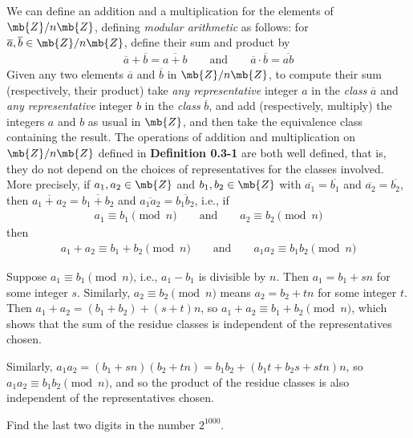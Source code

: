 {We can define an addition and a multiplication for the elements of $\mb{Z}/n\mb{Z}$,
defining {\sl modular arithmetic} as follows: for $\overline{a},\overline{b}\in\mb{Z}/n\mb{Z}$,
define their sum and product by
\begin{align*}
    \overline{a} + \overline{b} = \overline{a+b}\qquad\text{and}\qquad
    \overline{a} \cdot \overline{b} = \overline{ab}
\end{align*}}
Given any two elements $\overline{a}$ and $\overline{b}$ in $\mb{Z}/n\mb{Z}$, to compute
their sum (respectively, their product) take {\sl any representative} integer $a$ in the
{\sl class} $\overline{a}$ and {\sl any representative} integer $b$ in the {\sl class} $\overline{b}$,
and add (respectively, multiply) the integers $a$ and $b$ as usual in $\mb{Z}$, and then take
the equivalence class containing the result.
{The operations of addition and multiplication on $\mb{Z}/n\mb{Z}$ defined in \textbf{\textsf{\color{green!60!blue} Definition 0.3-1}}
are both well defined, that is, they do not depend on the choices of representatives for the classes involved.
More precisely, if $a_{1}, a_{2}\in \mb{Z}$ and $b_{1}, b_{2}\in \mb{Z}$ with $\overline{a_{1}} = \overline{b_{1}}$
and $\overline{a_{2}} = \overline{b_{2}}$, then $\overline{a_{1}+a_{2}} = \overline{b_{1} + b_{2}}$ and $\overline{a_{1}a_{2}} = \overline{b_{1}b_{2}}$, i.e., if
\begin{align*}
    a_{1} \equiv b_{1}\pmod{n}
    \qquad\text{and}\qquad
    a_{2} \equiv b_{2}\pmod{n}
\end{align*}
then
\begin{align*}
    a_{1} + a_{2} \equiv b_{1} + b_{2}\pmod{n}
    \qquad\text{and}\qquad
    a_{1}a_{2} \equiv b_{1}b_{2}\pmod{n}
\end{align*}
}
{Suppose $a_{1}\equiv b_{1}\pmod{n}$, i.e., $a_{1}-b_{1}$ is divisible by $n$.
Then $a_{1} = b_{1} + sn$ for some integer $s$.
Similarly, $a_{2}\equiv b_{2}\pmod{n}$ means $a_{2} = b_{2} + tn$ for some integer $t$.
Then $a_{1} + a_{2} = (b_{1} + b_{2}) + (s+t)n$, so $a_{1} + a_{2} \equiv b_{1} + b_{2}\pmod{n}$,
which shows that the sum of the residue classes is independent of the representatives chosen.

Similarly, $a_{1}a_{2} = (b_{1} + sn)(b_{2} + tn) = b_{1}b_{2} + (b_{1}t + b_{2}s + stn)n$,
so $a_{1}a_{2} \equiv b_{1}b_{2}\pmod{n}$, and so the product of the residue classes is also independent of the representatives chosen.
}
{Find the last two digits in the number $2^{1000}$.
}
